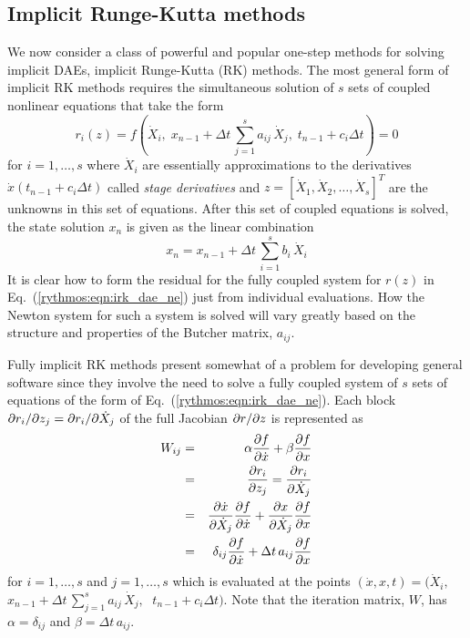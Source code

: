 
\subsection{Implicit Runge-Kutta methods\label{rythmos:sec:Implicit-Runge-Kutta-methods}}

We now consider a class of powerful and popular one-step methods for
solving implicit DAEs, implicit Runge-Kutta (RK) methods. The most
general form of implicit RK methods requires the simultaneous solution
of $s$ sets of coupled nonlinear equations that take the form
\begin{equation}
r_{i}(z)=f\left(\dot{X}_{i},\;x_{n-1}+\Delta t\,\sum_{j=1}^{s}a_{ij}\,\dot{X}_{j},\;t_{n-1}+c_{i}\Delta t\right)=0\label{rythmos:eqn:irk_dae_ne}
\end{equation}
for $i=1,\ldots,s$ where $\dot{X}_{i}$ are essentially approximations
to the derivatives $\dot{x}(t_{n-1}+c_{i}\Delta t)$ called \emph{stage
derivatives} and $z=[\dot{X}_{1},\dot{X}_{2},\ldots,\dot{X}_{s}]^{T}$
are the unknowns in this set of equations. After this set of coupled
equations is solved, the state solution $x_{n}$ is given as the linear
combination
\[
x_{n}=x_{n-1}+\Delta t\,\sum_{i=1}^{s}b_{i}\,\dot{X}_{i}
\]
It is clear how to form the residual for the fully coupled system
for $r(z)$ in Eq.~(\ref{rythmos:eqn:irk_dae_ne}) just from individual
evaluations. How the Newton system for such a system is solved will
vary greatly based on the structure and properties of the Butcher
matrix, $a_{ij}$. 

Fully implicit RK methods present somewhat of a problem for developing
general software since they involve the need to solve a fully coupled
system of $s$ sets of equations of the form of Eq.~(\ref{rythmos:eqn:irk_dae_ne}).
Each block $\partial r_{i} / \partial z_{j}=\partial r_{i} / \partial \dot{X}_{j}$ of the full
Jacobian $\partial r / \partial z$ is represented as 
\begin{eqnarray}
W_{ij} & = & \alpha\displaystyle{\frac{\partial f}{\partial \dot{x}}}+\beta\displaystyle{\frac{\partial f}{\partial x}}\nonumber \\
 & = & \displaystyle{\frac{\partial r_{i}}{\partial z_{j}}}=\displaystyle{\frac{\partial r_{i}}{\partial \dot{X}_{j}}}\nonumber \\
 & = & \frac{\partial\dot{x}}{\partial\dot{X}_{j}}\displaystyle{\frac{\partial f}{\partial \dot{x}}}+\frac{\partial x}{\partial\dot{X}_{j}}\displaystyle{\frac{\partial f}{\partial x}}\nonumber \\
 & = & \delta_{ij}\displaystyle{\frac{\partial f}{\partial \dot{x}}}+\Delta t\,a_{ij}\displaystyle{\frac{\partial f}{\partial x}}\label{rythmos:eq:dridzj_IRK}
\end{eqnarray}
for $i=1,\ldots,s$ and $j=1,\ldots,s$ which is evaluated at the
points $(\dot{x},x,t)=(\dot{X}_{i},\;$ $x_{n-1}+\Delta t\,\sum_{j=1}^{s}a_{ij}\,\dot{X}_{j},\;$
$t_{n-1}+c_{i}\Delta t)$. Note that the iteration matrix, $W$, has
$\alpha=\delta_{ij}$ and $\beta=\Delta t\,a_{ij}$.

